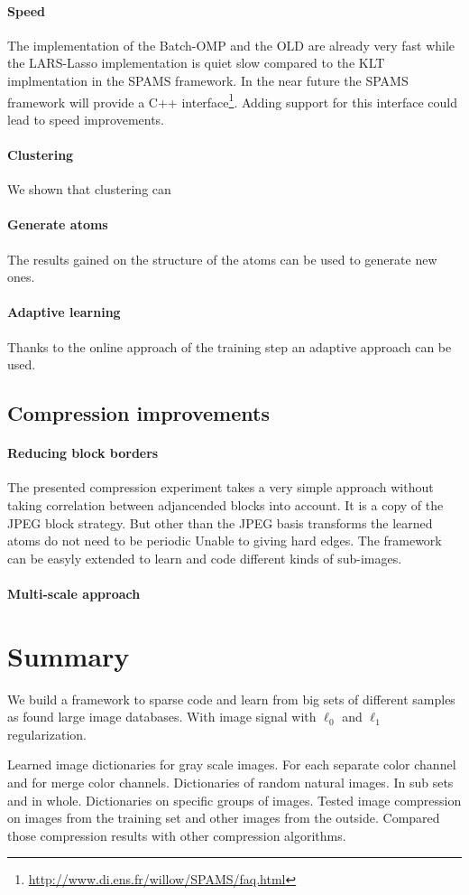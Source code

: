 \paragraph{Speed}
The implementation of the Batch-OMP and the OLD are already very fast while the
LARS-Lasso implementation is quiet slow compared to the KLT implmentation in the
SPAMS framework. In the near future the SPAMS framework will provide a C++
interface\footnote{\url{http://www.di.ens.fr/willow/SPAMS/faq.html}}. Adding
support for this interface could lead to speed improvements.

\paragraph{Clustering}
We shown that clustering can 

\paragraph{Generate atoms}
The results gained on the structure of the atoms can be used to generate new
ones.
\paragraph{Adaptive learning}
Thanks to the online approach of the training step an adaptive approach can be
used. 


\subsection{Compression improvements}
\paragraph{Reducing block borders} The presented compression experiment
takes a very simple approach without taking correlation between adjancended
blocks into account. It is a copy of the JPEG block strategy. But other than
the JPEG basis transforms the learned atoms do not need to be periodic
Unable to giving
hard edges. The framework can be easyly extended to learn and code different
kinds of sub-images.

\paragraph{Multi-scale approach}



\section{Summary} 
We build a framework to sparse code and learn from big sets of different samples
as found large image databases. With image signal with $\ell_0$ and $\ell_1$
regularization. 

Learned image dictionaries for gray scale images. For
each separate color channel and for merge color channels. Dictionaries of
random natural images. In sub sets and in whole. Dictionaries on specific
groups of images. 
Tested image compression on images from the training set and other images from
the outside. Compared those compression results with other compression
algorithms.



